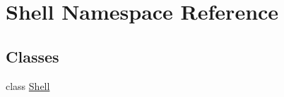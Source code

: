 \hypertarget{namespace_shell}{\section{Shell Namespace Reference}
\label{namespace_shell}
}
\subsection*{Classes}
\begin{DoxyCompactItemize}
\item 
class \hyperlink{class_shell_1_1_shell}{Shell}
\end{DoxyCompactItemize}
